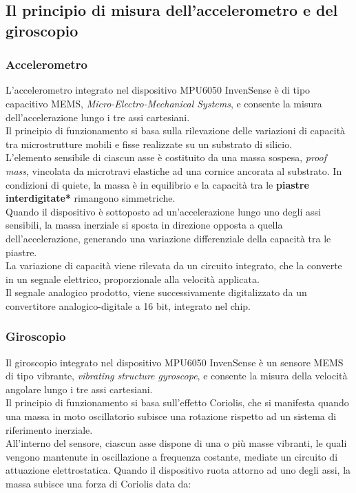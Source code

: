 \subsection{Il principio di misura dell'accelerometro e del giroscopio}
\subsubsection{Accelerometro}
L'accelerometro integrato nel dispositivo MPU6050 InvenSense è di tipo capacitivo MEMS, \textit{Micro-Electro-Mechanical Systems}, e consente la misura dell'accelerazione lungo i tre assi cartesiani.\\
Il principio di funzionamento si basa sulla rilevazione delle variazioni di capacità tra microstrutture mobili e fisse realizzate su un substrato di silicio.\\
L'elemento sensibile di ciascun asse è costituito da una massa sospesa, \textit{proof mass}, vincolata da microtravi elastiche ad una cornice ancorata al substrato.
In condizioni di quiete, la massa è in equilibrio e la capacità tra le \textbf{piastre interdigitate*} rimangono simmetriche.\\
Quando il dispositivo è sottoposto ad un'accelerazione lungo uno degli assi sensibili, la massa inerziale si sposta in direzione opposta a quella dell'accelerazione, generando una variazione differenziale 
della capacità tra le piastre.\\
La variazione di capacità viene rilevata da un circuito integrato, che la converte in un segnale elettrico, proporzionale alla velocità applicata.\\
Il segnale analogico prodotto, viene successivamente digitalizzato da un convertitore analogico-digitale a 16 bit, integrato nel chip.
\subsubsection{Giroscopio}
Il giroscopio integrato nel dispositivo MPU6050 InvenSense è un sensore MEMS di tipo vibrante, \textit{vibrating structure gyroscope}, e consente la misura della velocità angolare lungo i tre assi cartesiani.\\
Il principio di funzionamento si basa sull'effetto Coriolis, che si manifesta quando una massa in moto oscillatorio subisce una rotazione rispetto ad un sistema di riferimento inerziale.\\
All'interno del sensore, ciascun asse dispone di una o più masse vibranti, le quali vengono mantenute in oscillazione a frequenza costante, mediate un circuito di attuazione elettrostatica. Quando il dispositivo ruota attorno ad uno 
degli assi, la massa subisce una forza di Coriolis data da:

